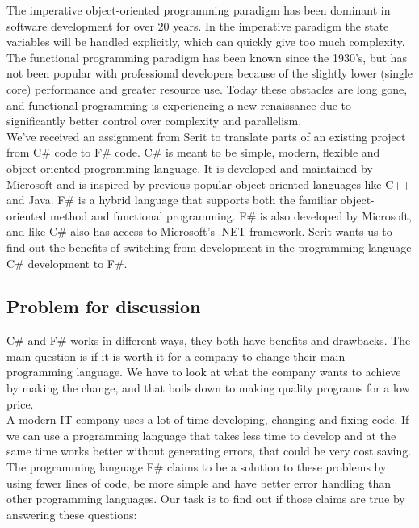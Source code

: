 \documentclass[12pt, a4paper]{article}
\begin{document}
The imperative object-oriented programming paradigm has been dominant in software development for over 20 years. In the imperative paradigm the state variables will be handled explicitly, which can quickly give too much complexity. The functional programming paradigm has been known since the 1930’s, but has not been popular with professional developers because of the slightly lower (single core) performance and greater resource use. Today these obstacles are long gone, and functional programming is experiencing a new renaissance due to significantly better control over complexity and parallelism.\\

We've received an assignment from Serit to translate parts of an existing project from C\# code to F\# code. C\# is meant to be simple, modern, flexible and object oriented programming language. It  is developed and maintained by Microsoft and is inspired by previous popular object-oriented languages like C++ and Java. F\# is a hybrid language that supports both the familiar object-oriented method and functional programming. F\# is also developed by Microsoft, and like C\# also has access to Microsoft’s .NET framework. Serit wants us to find out the benefits of  switching from development in the programming language C\# development to F\#.\\

\newpage
\subsection{Problem for discussion}
C\# and F\# works in different ways, they both have benefits and drawbacks. The main question is if it is worth it for a company to change their main programming language. We have to look at what the company wants to achieve by making the change, and that boils down to making quality programs for a low price. \\

A modern IT company uses a lot of time developing, changing and fixing code. If we can use a programming language that takes less time to develop and at the same time works better without generating errors, that could be very cost saving.\\

The programming language F\# claims to be a solution to these problems by using fewer lines of code, be more simple and have better error handling than other programming languages. Our task is to find out if those claims are true by answering these questions:
\end{document}
